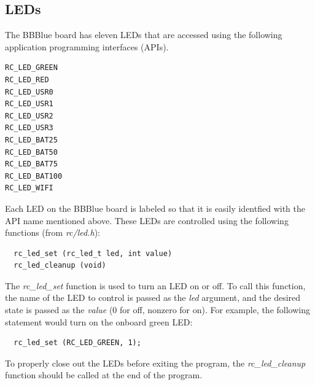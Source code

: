 \subsection{LEDs}
\label{sec:LEDs}
The BBBlue board has eleven LEDs that are accessed using the following application programming interfaces (APIs).
\begin{center}
\begin{verbatim}
RC_LED_GREEN
RC_LED_RED
RC_LED_USR0
RC_LED_USR1
RC_LED_USR2
RC_LED_USR3
RC_LED_BAT25
RC_LED_BAT50
RC_LED_BAT75
RC_LED_BAT100
RC_LED_WIFI
\end{verbatim}
\end{center}
%
Each LED on the BBBlue board is labeled so that it is easily identfied with the API name mentioned above. These LEDs are controlled using the following functions (from \emph{rc/led.h}):
\begin{verbatim}
  rc_led_set (rc_led_t led, int value)
  rc_led_cleanup (void)
\end{verbatim}
The \emph{rc\_led\_set} function is used to turn an LED on or off. To call this function, the name of the LED to control is passed as the \emph{led} argument, and the desired state is passed as the \emph{value} (0 for off, nonzero for on). For example, the following statement would turn on the onboard green LED:
\begin{verbatim}
  rc_led_set (RC_LED_GREEN, 1);
\end{verbatim}
To properly close out the LEDs before exiting the program, the \emph{rc\_led\_cleanup} function should be called at the end of the program.

